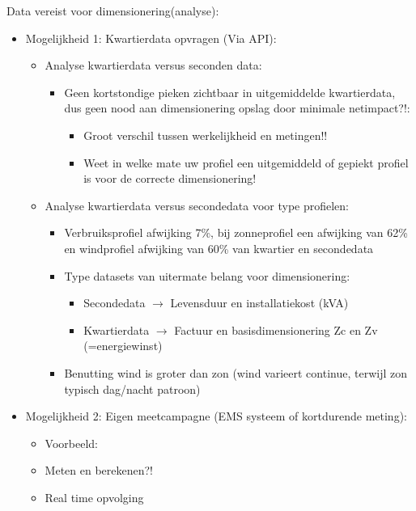 \documentclass[12pt]{article}
\begin{document}
Data vereist voor dimensionering(analyse):\begin{itemize}
    \item Mogelijkheid 1: Kwartierdata opvragen (Via API):\begin{itemize}
        \item Analyse kwartierdata versus seconden data:\begin{itemize}
            \item Geen kortstondige pieken zichtbaar in uitgemiddelde kwartierdata, dus geen nood aan dimensionering opslag door minimale netimpact?!:\begin{itemize}
                \item Groot verschil tussen werkelijkheid en metingen!! 
                \item Weet in welke mate uw profiel een uitgemiddeld of gepiekt
                profiel is voor de correcte dimensionering!
            \end{itemize}
        \end{itemize}
        \item Analyse kwartierdata versus secondedata voor type profielen:\begin{itemize}
            \item Verbruiksprofiel afwijking 7\%, bij zonneprofiel een afwijking van 62\% en windprofiel afwijking van 60\% van kwartier en secondedata
            \item Type datasets van uitermate belang voor dimensionering:\begin{itemize}
                \item Secondedata $\rightarrow$ Levensduur en installatiekost (kVA) 
                \item Kwartierdata $\rightarrow$ Factuur en basisdimensionering Zc en Zv (=energiewinst)
            \end{itemize}
            \item Benutting wind is groter dan zon (wind varieert continue, terwijl zon typisch dag/nacht patroon)
        \end{itemize}
    \end{itemize}
    \item Mogelijkheid 2: Eigen meetcampagne (EMS systeem of  kortdurende meting):\begin{itemize}
        \item Voorbeeld:
        \item Meten en berekenen?!
        \item Real time opvolging
    \end{itemize}
\end{itemize}
\end{document}
